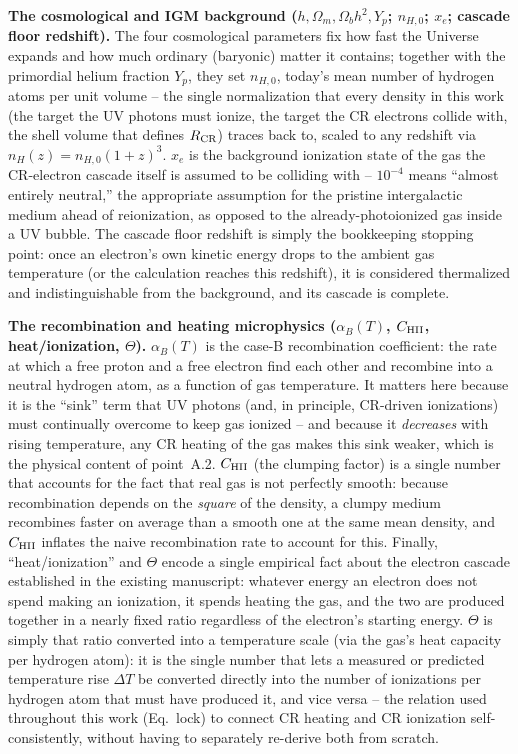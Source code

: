 \documentclass[11pt,a4paper]{article}
\begin{document}
\textbf{The cosmological and IGM background ($h,\Omega_m,\Omega_b h^2,Y_p$; $n_{H,0}$; $x_e$;
cascade floor redshift).} The four cosmological parameters fix how fast the Universe expands
and how much ordinary (baryonic) matter it contains; together with the primordial helium
fraction $Y_p$, they set $n_{H,0}$, today's mean number of hydrogen atoms per unit volume --
the single normalization that every density in this work (the target the UV photons must
ionize, the target the CR electrons collide with, the shell volume that defines $R_{\rm CR}$)
traces back to, scaled to any redshift via $n_H(z)=n_{H,0}(1+z)^3$. $x_e$ is the background
ionization state of the gas the CR-electron cascade itself is assumed to be colliding with --
$10^{-4}$ means ``almost entirely neutral,'' the appropriate assumption for the pristine
intergalactic medium ahead of reionization, as opposed to the already-photoionized gas inside
a UV bubble. The cascade floor redshift is simply the bookkeeping stopping point: once an
electron's own kinetic energy drops to the ambient gas temperature (or the calculation reaches
this redshift), it is considered thermalized and indistinguishable from the background, and
its cascade is complete.

\textbf{The recombination and heating microphysics ($\alpha_B(T)$, $C_{\rm HII}$,
heat/ionization, $\Theta$).} $\alpha_B(T)$ is the case-B recombination coefficient: the rate at
which a free proton and a free electron find each other and recombine into a neutral hydrogen
atom, as a function of gas temperature. It matters here because it is the ``sink'' term that
UV photons (and, in principle, CR-driven ionizations) must continually overcome to keep gas
ionized -- and because it \emph{decreases} with rising temperature, any CR heating of the gas
makes this sink weaker, which is the physical content of point~A.2. $C_{\rm HII}$ (the
clumping factor) is a single number that accounts for the fact that real gas is not perfectly
smooth: because recombination depends on the \emph{square} of the density, a clumpy medium
recombines faster on average than a smooth one at the same mean density, and $C_{\rm HII}$
inflates the naive recombination rate to account for this. Finally, ``heat/ionization'' and
$\Theta$ encode a single empirical fact about the electron cascade established in the existing
manuscript: whatever energy an electron does not spend making an ionization, it spends heating
the gas, and the two are produced together in a nearly fixed ratio regardless of the
electron's starting energy. $\Theta$ is simply that ratio converted into a temperature scale
(via the gas's heat capacity per hydrogen atom): it is the single number that lets a measured
or predicted temperature rise $\Delta T$ be converted directly into the number of ionizations
per hydrogen atom that must have produced it, and vice versa -- the relation used throughout
this work (Eq.~lock) to connect CR heating and CR ionization self-consistently, without having
to separately re-derive both from scratch.


\end{document}
